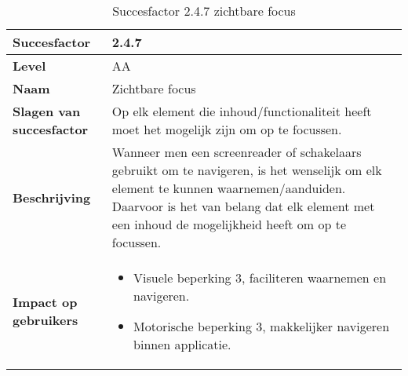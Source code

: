 \begin{table}[H]
    \centering
    \caption{Succesfactor 2.4.7 zichtbare focus}
    
    
    \hspace*{-1cm}\begin{tabular}{|l|p{12cm}|} 
        \hline
        \textbf{Succesfactor}                 & 2.4.7                                                                                                                                                                                                                                                                                                                                                                                                                                                                                                          \\ 
        \hline
        \textbf{Level}                        & AA                                                                                                                                                                                                                                                                                                                                                                                                                                                                                                               \\ 
        \hline
        \textbf{Naam}                         & Zichtbare focus~                                                                                                                                                                                                                                                                                                                                                                                                                                                                                      \\ 
        \hline
        \textbf{Slagen van succesfactor}      & Op elk element die inhoud/functionaliteit heeft moet het mogelijk zijn om op te focussen.                                                                                                                 \\ 
        
        \hline
        \textbf{Beschrijving}                 & Wanneer men een screenreader of schakelaars gebruikt om te navigeren, is het wenselijk om elk element te kunnen waarnemen/aanduiden. Daarvoor is het van belang dat elk element met een inhoud de mogelijkheid heeft om op te focussen.\\ 
        \hline
        \textbf{Impact op gebruikers}         &  
        \begin{itemize}
            \item Visuele beperking 3, faciliteren waarnemen en navigeren.
            \item Motorische beperking 3, makkelijker navigeren binnen applicatie.
            

\end{itemize}
\end{tabular}
\end{table}
